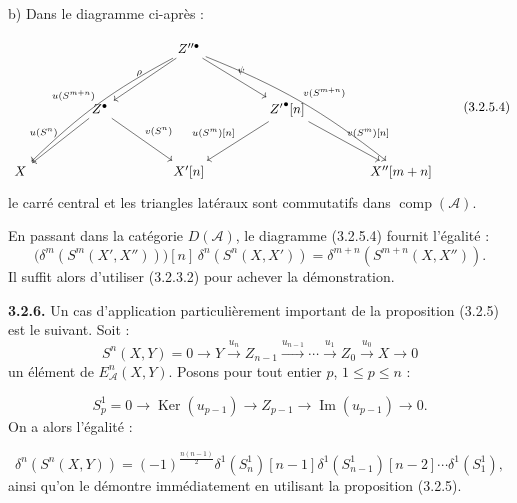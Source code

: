 \clearpage
{}%
\begingroup\small\setlength{\parskip}{0pt}\setlength{\emergencystretch}{1.5em}
\setlength{\abovedisplayskip}{4pt plus 2pt minus 2pt}%
\setlength{\belowdisplayskip}{4pt plus 2pt minus 2pt}%

\noindent b) Dans le diagramme ci-après :

\begin{equation}
\resizebox{0.96\textwidth}{!}{%
$\begin{tikzcd}[ampersand replacement=\&,column sep=4.1em,row sep=3.0em]
\&\& Z''^\bullet
  \arrow[ddll,bend right=8,"{u(S^{m+n})}"']
  \arrow[dl,"\rho"']
  \arrow[dr,"\psi"]
  \arrow[ddrr,bend left=8,"{v(S^{m+n})}"]
\&\& \\
\& Z^\bullet
  \arrow[dl,"{u(S^n)}"']
  \arrow[dr,"{v(S^n)}"]
\&\& {Z'}^\bullet[n]
  \arrow[dl,"{u(S^m)[n]}"']
  \arrow[dr,"{v(S^m)[n]}"]
\& \\
X \&\& X'[n] \&\& X''[m+n]
\end{tikzcd}$%
}
\tag{3.2.5.4}
\end{equation}
le carré central et les triangles latéraux sont commutatifs dans
$\operatorname{comp}(\mathcal A)$.

En passant dans la catégorie $D(\mathcal A)$, le diagramme (3.2.5.4)
fournit l'égalité :
\[
\bigl(\delta^m(S^m(X',X''))\bigr)[n]\,
\delta^n(S^n(X,X'))
=\delta^{m+n}(S^{m+n}(X,X'')).
\]
Il suffit alors d'utiliser (3.2.3.2) pour achever la démonstration.

\medskip\noindent\textbf{3.2.6.}\quad
Un cas d'application particulièrement important de la proposition (3.2.5)
est le suivant. Soit :
\[
S^n(X,Y)=0\longrightarrow Y\xrightarrow{u_n}Z_{n-1}
\xrightarrow{u_{n-1}}\cdots\xrightarrow{u_1}Z_0
\xrightarrow{u_0}X\longrightarrow0
\]
un élément de $E_{\mathcal A}^{n}(X,Y)$. Posons pour tout entier $p$,
$1\leq p\leq n$ :

\begin{equation}
S_p^1=0\longrightarrow\operatorname{Ker}(u_{p-1})
\longrightarrow Z_{p-1}\longrightarrow\operatorname{Im}(u_{p-1})
\longrightarrow0.
\tag{3.2.6.1}
\end{equation}
On a alors l'égalité :

\begin{equation}
\delta^n(S^n(X,Y))=(-1)^{\frac{n(n-1)}2}
\delta^1(S_n^1)[n-1]\delta^1(S_{n-1}^1)[n-2]\cdots
\delta^1(S_1^1),
\tag{3.2.6.2}
\end{equation}
ainsi qu'on le démontre immédiatement en utilisant la proposition (3.2.5).

